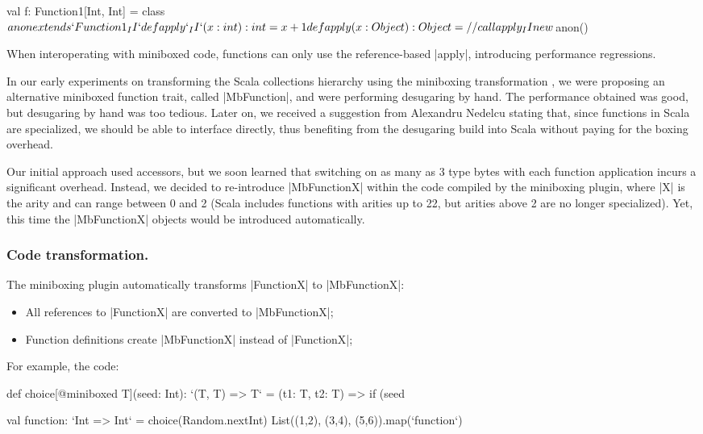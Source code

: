 \begin{lstlisting-nobreak}
 val f: Function1[Int, Int] = {
   class $anon extends `Function1_II` {
     def apply`_II`(x: int): int = x + 1
     def apply(x: Object): Object = // call apply_II
   }
   new $anon()
 }
\end{lstlisting-nobreak}

When interoperating with miniboxed code, functions can only use the reference-based |apply|, introducing performance regressions.

In our early experiments on transforming the Scala collections hierarchy using the miniboxing transformation \cite{miniboxing-linkedlist}, we were proposing an alternative miniboxed function trait, called |MbFunction|, and were performing desugaring by hand. The performance obtained was good, but desugaring by hand was too tedious. Later on, we received a suggestion from Alexandru Nedelcu stating that, since functions in Scala are specialized, we should be able to interface directly, thus benefiting from the desugaring build into Scala without paying for the boxing overhead.

Our initial approach used accessors, but we soon learned that switching on as many as 3 type bytes with each function application incurs a significant overhead. Instead, we decided to re-introduce |MbFunctionX| within the code compiled by the miniboxing plugin, where |X| is the arity and can range between 0 and 2 (Scala includes functions with arities up to 22, but arities above 2 are no longer specialized). Yet, this time the |MbFunctionX| objects would be introduced automatically.

\subsubsection*{Code transformation.} The miniboxing plugin automatically transforms |FunctionX| to |MbFunctionX|:

\begin{itemize}
  \item All references to |FunctionX| are converted to |MbFunctionX|;
  \item Function definitions create |MbFunctionX| instead of |FunctionX|;
\end{itemize}

For example, the code:

\begin{lstlisting-nobreak}
 def choice[@miniboxed T](seed: Int): `(T, T) => T` =
   (t1: T, t2: T) => if (seed %

 val function: `Int => Int` = choice(Random.nextInt)
 List((1,2), (3,4), (5,6)).map(`function`)
\end{lstlisting-nobreak}

